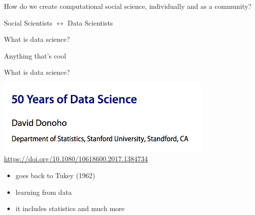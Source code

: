 \documentclass{beamer}
\def\vf{\vfill}
\begin{document}
\begin{frame}

\begin{center}
\LARGE{How do we create computational social science, individually and as a community?}
\end{center}

\end{frame}
\begin{frame}

\begin{center}
\LARGE{Social Scientists $\longleftrightarrow$ Data Scientists}
\end{center}

\end{frame}
\begin{frame}

\begin{center}
\LARGE{What is data science?}
\end{center}

\end{frame}
\begin{frame}

\begin{center}
\LARGE{Anything that's cool}
\end{center}

\end{frame}
\begin{frame}

\begin{center}
\LARGE{What is data science?}
\end{center}

\end{frame}
\begin{frame}

\begin{center}
\includegraphics[width=0.8\textwidth]{figures/donoho_50_2017_title.png}\\
\tiny{\textcolor{blue}{\url{https://doi.org/10.1080/10618600.2017.1384734 }}}
\end{center}
\pause
\vf
\begin{itemize}
\item goes back to Tukey (1962)
\pause
\item learning from data
\pause
\item it includes statistics and much more
\end{itemize}

\end{frame}
\end{document}
